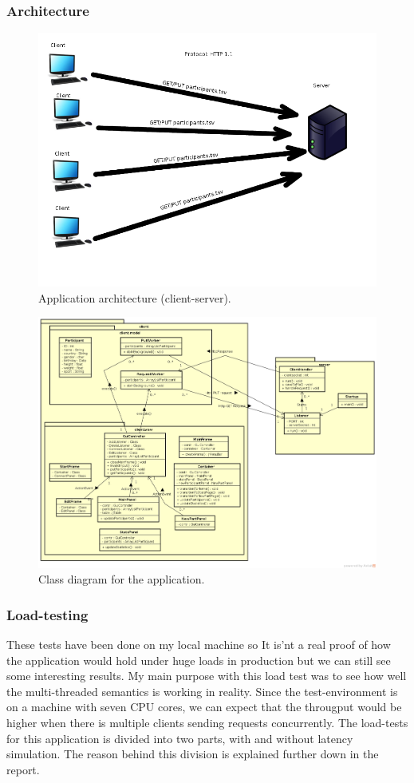 \documentclass[a4paper, 11pt]{article}
\begin{document}
\subsubsection{Architecture}
\begin{figure}[H]
\includegraphics[scale=0.50]{http_architecture.png}
\caption{Application architecture (client-server).}
\end{figure}
\begin{figure}[H]
\includegraphics[scale=0.35]{assignment1_architecture.png}
\caption{Class diagram for the application.}
\end{figure}
\subsubsection{Load-testing}
These tests have been done on my local machine so It is'nt a real proof of how the application would hold under huge loads in production but we can still see some interesting results.
My main purpose with this load test was to see how well the multi-threaded semantics is working in reality. Since the test-environment is on a machine with seven CPU cores, we can expect that the througput would be higher when there is multiple clients sending requests concurrently. The load-tests for this application is divided into two parts, with and without latency simulation. The reason behind this division is explained further down in the report.
\end{document}
